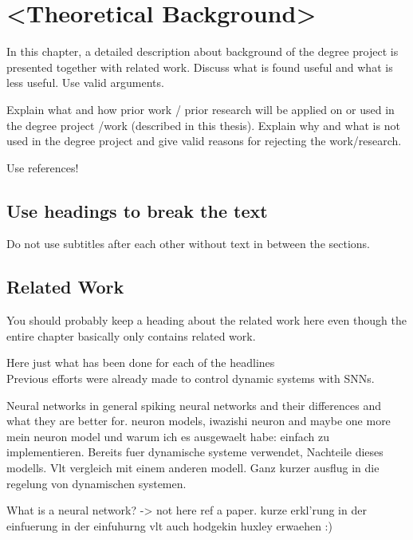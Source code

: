 \chapter{<Theoretical Background>}
In this chapter, a detailed description about background of the degree project is presented together with related work. Discuss what is found useful and what is less useful. Use valid arguments.

Explain what and how prior work / prior research will be applied on or used in the degree project /work (described in this thesis). Explain why and what is not used in the degree project and give valid reasons for rejecting the work/research.

Use references!

\section{Use headings to break the text}
Do not use subtitles after each other without text in between the sections.

\section{Related Work}
You should probably keep a heading about the related work here even though the entire chapter basically only contains related work.

Here just what has been done for each of the headlines\\
Previous efforts were already made to control dynamic systems with \acp{SNN}.




Neural networks in general
spiking neural networks and their differences and what they are better for.
neuron models, iwazishi neuron and maybe one more
mein neuron model und warum ich es ausgewaelt habe: einfach zu implementieren. Bereits fuer dynamische systeme verwendet,
Nachteile dieses modells.
Vlt vergleich mit einem anderen modell.
Ganz kurzer ausflug in die regelung von dynamischen systemen.


What is a neural network? -> not here ref a paper. kurze erkl'rung in der einfuerung
in der einfuhurng vlt auch hodgekin huxley erwaehen :)


